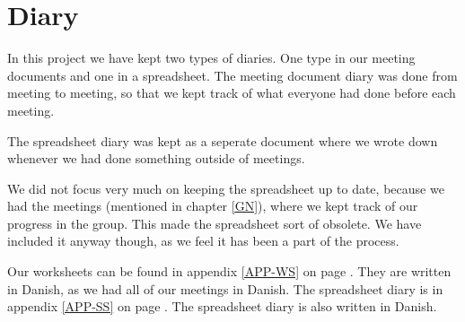 \chapter{Diary}
In this project we have kept two types of diaries. One type in our meeting
documents and one in a spreadsheet. The meeting document diary was done from
meeting to meeting, so that we kept track of what everyone had done before each
meeting.

The spreadsheet diary was kept as a seperate document where we wrote down
whenever we had done something outside of meetings. 

We did not focus very much on keeping the spreadsheet up to date, because we
had the meetings (mentioned in chapter \ref{GN}), where we kept track of our
progress in the group. This made the spreadsheet sort of obsolete. We have
included it anyway though, as we feel it has been a part of the process.

Our worksheets can be found in appendix \ref{APP-WS} on page \pageref{APP-WS}.
They are written in Danish, as we had all of our meetings in Danish. The spreadsheet
diary is in appendix \ref{APP-SS}  on page
\pageref{APP-SS}. The spreadsheet diary is also written in Danish.